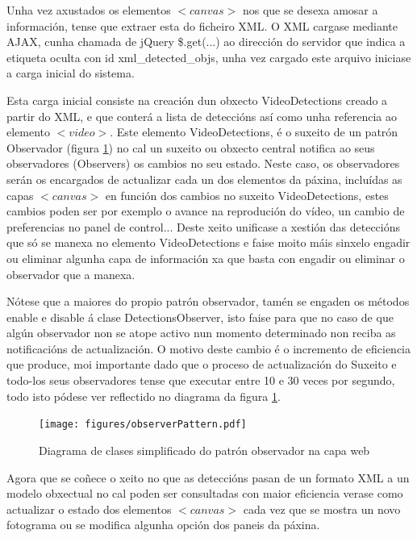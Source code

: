         Unha vez axustados os elementos $<canvas>$ nos que se desexa amosar a información, tense que 
        extraer esta do ficheiro XML. O XML cargase mediante AJAX, cunha chamada de jQuery \$.get(...) 
        ao dirección do servidor que indica a etiqueta oculta con id xml\_detected\_objs, unha vez cargado
        este arquivo iniciase a carga inicial do sistema.
        
        Esta carga inicial consiste na creación dun obxecto VideoDetections creado a partir do XML, e
        que conterá a lista de deteccións así como unha referencia ao elemento $<video>$. Este elemento
        VideoDetections, é o suxeito de un patrón Observador (figura \ref{fig:observerPattern})
        no cal un suxeito ou obxecto central notifica ao seus observadores (Observers) os cambios 
        no seu estado. Neste caso, os observadores serán os encargados de actualizar cada un dos
        elementos da páxina, incluídas as capas $<canvas>$ en función dos cambios no suxeito VideoDetections,
        estes cambios poden ser por exemplo o avance na reprodución do vídeo, un cambio de 
        preferencias no panel de control... Deste xeito unificase a xestión das deteccións que só
        se manexa no elemento VideoDetections e faise moito máis sinxelo engadir ou eliminar
        algunha capa de información xa que basta con engadir ou eliminar o observador que a manexa.
        
        Nótese que a maiores do propio patrón observador, tamén se engaden os métodos enable e disable á
        clase DetectionsObserver, isto faise para que no caso de que algún observador non se atope 
        activo nun momento determinado non reciba as notificacións de actualización. O motivo deste
        cambio é o incremento de eficiencia que produce, moi importante dado que o proceso de actualización
        do Suxeito e todo-los seus observadores tense que executar entre 10 e 30 veces por segundo, todo
        isto pódese ver reflectido no diagrama da figura \ref{fig:observerPattern}.
        
        \begin{figure}[htp]
        \begin{center}
            \texttt{[image: figures/observerPattern.pdf]}
            \caption{Diagrama de clases simplificado do patrón observador na capa web}
        \label{fig:observerPattern}
        \end{center}
        \end{figure}
        
        Agora que se coñece o xeito no que as deteccións pasan de un formato XML a un modelo obxectual 
        no cal poden ser consultadas con maior eficiencia verase como actualizar o estado dos elementos
        $<canvas>$ cada vez que se mostra un novo fotograma ou se modifica algunha opción dos paneis da
        páxina.
        
